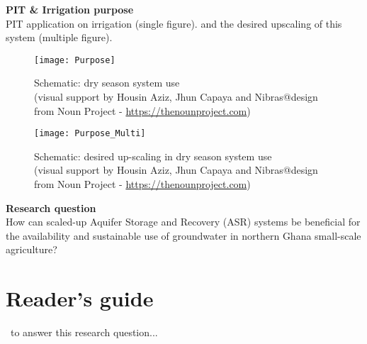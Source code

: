 \textbf{PIT \& Irrigation purpose} \\
PIT application on irrigation (single figure). and the desired upscaling of this system (multiple figure). \\

\begin{figure}[h]
 \centering\texttt{[image: Purpose]}
 \captionsetup{justification=centering}
 \caption[Schematic: dry season system use]{Schematic: dry season system use \\ (visual support by Housin Aziz, Jhun Capaya and Nibras@design from Noun Project - \url{https://thenounproject.com})}
 \label{fig:Purpose}
\end{figure}

\begin{figure}[h]
 \centering\texttt{[image: Purpose\_Multi]}
 \captionsetup{justification=centering}
 \caption[Schematic: desired up-scaling in dry season system use]{Schematic: desired up-scaling in dry season system use \\ (visual support by Housin Aziz, Jhun Capaya and Nibras@design from Noun Project - \url{https://thenounproject.com})}
 \label{fig:Purpose_Multi}
\end{figure}

\textbf{Research question}\\

How can scaled-up Aquifer Storage and Recovery (ASR) systems be beneficial for the availability and sustainable use of groundwater in northern Ghana small-scale agriculture? \\

\section{Reader's guide}\
to answer this research question... 
